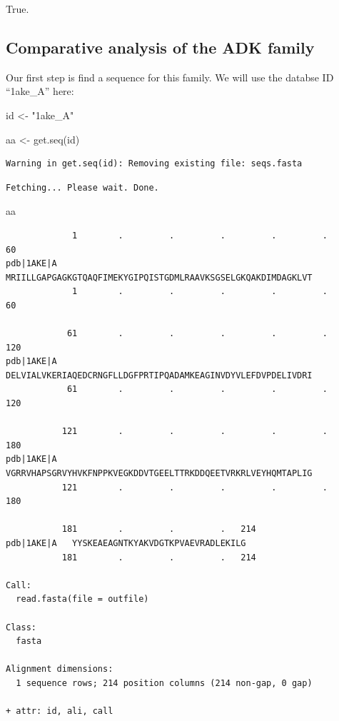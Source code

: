 \documentclass[
  letterpaper,
  DIV=11,
  numbers=noendperiod]{scrartcl}
\newenvironment{Shaded}{\begin{snugshade}}{\end{snugshade}}
\newcommand{\FunctionTok}[1]{\textcolor[rgb]{0.28,0.35,0.67}{#1}}
\newcommand{\NormalTok}[1]{\textcolor[rgb]{0.00,0.23,0.31}{#1}}
\newcommand{\OtherTok}[1]{\textcolor[rgb]{0.00,0.23,0.31}{#1}}
\newcommand{\StringTok}[1]{\textcolor[rgb]{0.13,0.47,0.30}{#1}}
\begin{document}
True.

\subsection{Comparative analysis of the ADK
family}\label{comparative-analysis-of-the-adk-family}

Our first step is find a sequence for this family. We will use the
databse ID ``1ake\_A'' here:

\begin{Shaded}
\begin{Highlighting}[]
\NormalTok{id }\OtherTok{\textless{}{-}} \StringTok{"1ake\_A"}

\NormalTok{aa }\OtherTok{\textless{}{-}} \FunctionTok{get.seq}\NormalTok{(id)}
\end{Highlighting}
\end{Shaded}

\begin{verbatim}
Warning in get.seq(id): Removing existing file: seqs.fasta
\end{verbatim}

\begin{verbatim}
Fetching... Please wait. Done.
\end{verbatim}

\begin{Shaded}
\begin{Highlighting}[]
\NormalTok{aa}
\end{Highlighting}
\end{Shaded}

\begin{verbatim}
             1        .         .         .         .         .         60 
pdb|1AKE|A   MRIILLGAPGAGKGTQAQFIMEKYGIPQISTGDMLRAAVKSGSELGKQAKDIMDAGKLVT
             1        .         .         .         .         .         60 

            61        .         .         .         .         .         120 
pdb|1AKE|A   DELVIALVKERIAQEDCRNGFLLDGFPRTIPQADAMKEAGINVDYVLEFDVPDELIVDRI
            61        .         .         .         .         .         120 

           121        .         .         .         .         .         180 
pdb|1AKE|A   VGRRVHAPSGRVYHVKFNPPKVEGKDDVTGEELTTRKDDQEETVRKRLVEYHQMTAPLIG
           121        .         .         .         .         .         180 

           181        .         .         .   214 
pdb|1AKE|A   YYSKEAEAGNTKYAKVDGTKPVAEVRADLEKILG
           181        .         .         .   214 

Call:
  read.fasta(file = outfile)

Class:
  fasta

Alignment dimensions:
  1 sequence rows; 214 position columns (214 non-gap, 0 gap) 

+ attr: id, ali, call
\end{verbatim}
\end{document}
